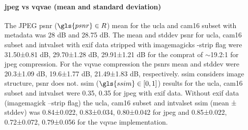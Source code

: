 \documentclass[review]{elsarticle}
\begin{document}
\paragraph{\gls{jpeg} vs \gls{vqvae} (mean and standard deviation)} The JPEG \gls{psnr} ($\gls{psnr}\in R$) \gls{mean} for the \gls{ucla} and \gls{cam16} subset with metadata was 28 dB and 28.75 dB. The \gls{mean} and \gls{stddev} \gls{psnr} for \gls{ucla}, \gls{cam16} subset and \gls{intvalset} with \gls{exif} data stripped with imagemagicks -strip flag were 31.50±0.81 dB, 29.70±1.28 dB, 29.91±1.21 dB for the \gls{comprat} of $\sim$19.2:1 for \gls{jpeg} compression. For the \gls{vqvae} compression the \gls{psnr}s \gls{mean} and \gls{stddev} were 20.3±1.09 dB, 19.6±1.77 dB, 21.49±1.83 dB, respectively. \gls{ssim} considers image structure, \gls{psnr} does not. \gls{ssim} ($\gls{ssim}\in [0,1]$) results for the \gls{ucla}, \gls{cam16} subset and \gls{intvalset} were 0.35, 0.35 for \gls{jpeg} with \gls{exif} data. Without \gls{exif} data (imagemagick –strip flag) the \gls{ucla}, \gls{cam16} subset and \gls{intvalset} \gls{ssim} (\gls{mean} ± \gls{stddev}) was 0.84±0.022, 0.83±0.034, 0.80±0.042 for \gls{jpeg} and 0.85±0.022, 0.72±0.072, 0.79±0.056 for the \gls{vqvae} implementation.

\end{document}
